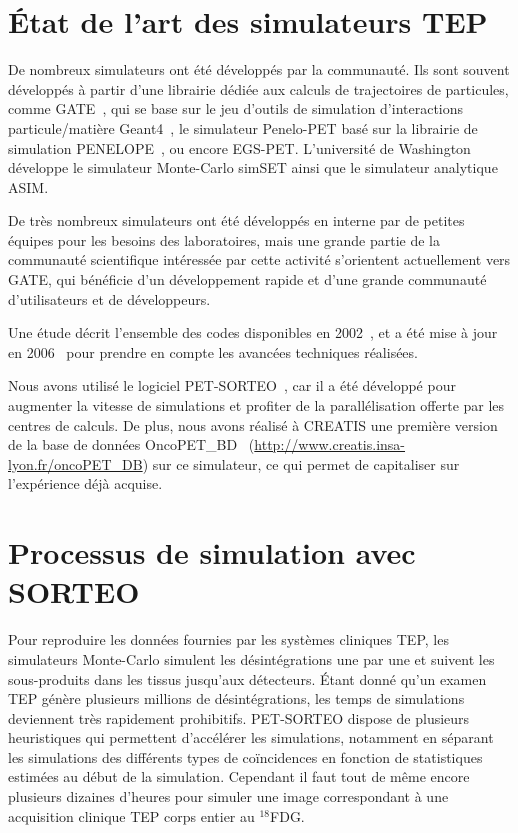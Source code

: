 	\section{\'Etat de l'art des simulateurs TEP}

De nombreux simulateurs ont été développés par la communauté. Ils sont souvent développés à partir d'une librairie dédiée aux calculs de trajectoires de particules, comme GATE~\cite{jan2004gate}, qui se base sur le jeu d'outils de simulation d'interactions particule/matière Geant4~\cite{allison2006geant4}, le simulateur Penelo-PET\cite{espana2009penelopet} basé sur la librairie de simulation  PENELOPE~\cite{salvat2006penelope}, ou encore EGS-PET. L’université de Washington développe le simulateur Monte-Carlo simSET ainsi que le simulateur analytique ASIM. 

De très nombreux simulateurs ont été développés en interne par de petites équipes pour les besoins des laboratoires, mais une grande partie de la communauté scientifique intéressée par cette activité s'orientent actuellement vers GATE, qui bénéficie d'un développement rapide et d'une grande communauté d'utilisateurs et de développeurs.

Une étude décrit l'ensemble des codes disponibles en 2002~\cite{buvat2002monte}, et a été mise à jour en 2006~\cite{buvat2006monte} pour prendre en compte les avancées techniques réalisées.

Nous avons utilisé le logiciel PET-SORTEO~\cite{reilhac2004pet}, car il a été développé pour augmenter la vitesse de simulations et profiter de la parallélisation offerte par les centres de calculs. De plus, nous avons réalisé à CREATIS une première version de la base de données OncoPET\_BD~\cite{tomei2010oncopet_db} (\url{http://www.creatis.insa-lyon.fr/oncoPET\_DB}) sur ce simulateur, ce qui permet de capitaliser sur l’expérience déjà acquise. 

	\section{Processus de simulation avec SORTEO}
\label{lab:simuSORTEO}
Pour reproduire les données fournies par les systèmes cliniques TEP, les simulateurs Monte-Carlo simulent les désintégrations une par une et suivent les sous-produits dans les tissus jusqu'aux détecteurs. Étant donné qu'un examen TEP génère plusieurs millions de désintégrations, les temps de simulations deviennent très rapidement prohibitifs. PET-SORTEO dispose de plusieurs heuristiques qui permettent d'accélérer les simulations, notamment en séparant les simulations des différents types de coïncidences en fonction de statistiques estimées au début de la simulation. Cependant il faut tout de même encore plusieurs dizaines d'heures pour simuler une image correspondant à une acquisition clinique TEP corps entier au $^{18}$FDG.

